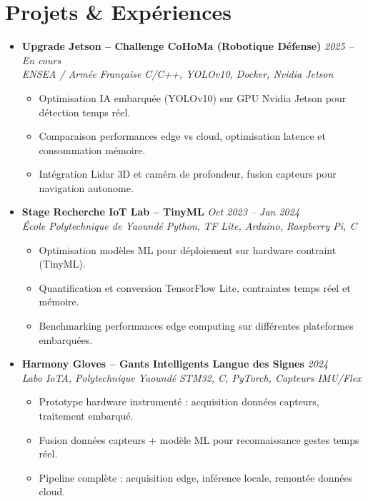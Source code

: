 \documentclass[a4paper,11pt]{article}
\begin{document}
\section{Projets \& Expériences}
\begin{itemize}[leftmargin=*, label={-}]

\item \textbf{Upgrade Jetson -- Challenge CoHoMa (Robotique Défense)} \hfill \textit{2025 -- En cours} \\
\textit{ENSEA / Armée Française} \hfill \textit{C/C++, YOLOv10, Docker, Nvidia Jetson}
\vspace{-2pt}
    \begin{itemize}[leftmargin=0.4cm, nosep, label=\tiny$\bullet$]
        \item \small{Optimisation IA embarquée (YOLOv10) sur GPU Nvidia Jetson pour détection temps réel.}
        \item \small{Comparaison performances edge vs cloud, optimisation latence et consommation mémoire.}
        \item \small{Intégration Lidar 3D et caméra de profondeur, fusion capteurs pour navigation autonome.}
    \end{itemize}
\vspace{3pt}

\item \textbf{Stage Recherche IoT Lab -- TinyML} \hfill \textit{Oct 2023 -- Jan 2024} \\
\textit{École Polytechnique de Yaoundé} \hfill \textit{Python, TF Lite, Arduino, Raspberry Pi, C}
\vspace{-2pt}
    \begin{itemize}[leftmargin=0.4cm, nosep, label=\tiny$\bullet$]
        \item \small{Optimisation modèles ML pour déploiement sur hardware contraint (TinyML).}
        \item \small{Quantification et conversion TensorFlow Lite, contraintes temps réel et mémoire.}
        \item \small{Benchmarking performances edge computing sur différentes plateformes embarquées.}
    \end{itemize}
\vspace{3pt}

\item \textbf{Harmony Gloves -- Gants Intelligents Langue des Signes} \hfill \textit{2024} \\
\textit{Labo IoTA, Polytechnique Yaoundé} \hfill \textit{STM32, C, PyTorch, Capteurs IMU/Flex}
\vspace{-2pt}
    \begin{itemize}[leftmargin=0.4cm, nosep, label=\tiny$\bullet$]
        \item \small{Prototype hardware instrumenté : acquisition données capteurs, traitement embarqué.}
        \item \small{Fusion données capteurs + modèle ML pour reconnaissance gestes temps réel.}
        \item \small{Pipeline complète : acquisition edge, inférence locale, remontée données cloud.}
    \end{itemize}
\vspace{3pt}


\end{itemize}
\end{document}
